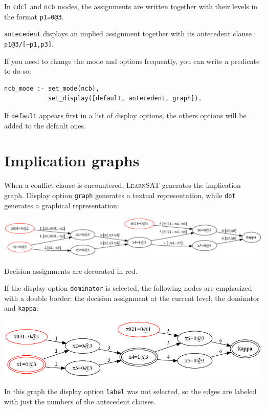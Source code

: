 \documentclass[11pt]{article}
\newcommand*{\p}[1]{\textup{\texttt{#1}}}
\newcommand*{\ls}{\textsc{LearnSAT}}
\begin{document}
In \p{cdcl} and \p{ncb} modes, the assignments are written together with
their levels in the format \p{p1=0@3}.

\p{antecedent} displays an implied assignment together with its
antecedent clause : \verb+p1@3/[~p1,p3]+.

If you need to change the mode and options frequently, you can write a
predicate to do so:

\begin{verbatim}
ncb_mode :- set_mode(ncb), 
            set_display([default, antecedent, graph]).
\end{verbatim}
If \p{default} appears first in a list of display options, the
others options will be added to the default ones.

\section{Implication graphs}\label{s.impl}

When a conflict clause is encountered, \ls{} generates the implication
graph. Display option \p{graph} generates a textual representation,
while \p{dot} generates a graphical representation:

\begin{center}
\includegraphics[keepaspectratio=true,width=.9\textwidth]{graph}
\end{center}

Decision assignments are decorated in red.

If the display option \p{dominator} is selected, the following nodes are
emphasized with a double border: the decision assignment at the current
level, the dominator and \p{kappa}:

\begin{center}
\includegraphics[keepaspectratio=true,width=.9\textwidth]{dom}
\end{center}

In this graph the display option \p{label} was not selected, so the
edges are labeled with just the numbers of the antecedent clauses.
\end{document}

